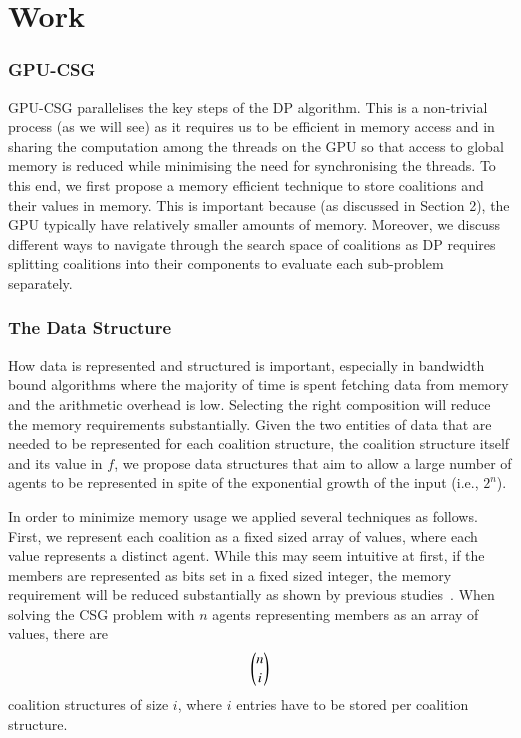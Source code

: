 \documentclass[a4paper, 12pt]{report}
\begin{document}
\section{Work}


\subsubsection{GPU-CSG} \label{sec:gpu-csg} %
GPU-CSG parallelises the key steps of the DP algorithm. This is a non-trivial
process (as we will see) as it requires us to be efficient in memory access and
in sharing the computation among the threads on the GPU so that access to global
memory is reduced while minimising the need for synchronising the threads. To
this end, we first propose a memory efficient technique to store coalitions and
their values in memory. This is important because (as discussed  in Section 2),
the GPU typically have relatively smaller amounts of memory. Moreover, we
discuss different ways to navigate through the search space of coalitions as DP
requires splitting coalitions into their components to evaluate each sub-problem
separately.
\subsubsection{The Data Structure}\label{sec:data}
How data is represented and structured is important, especially in bandwidth
bound algorithms where the majority of time is spent fetching data from memory
and the arithmetic overhead is low.
Selecting the right composition will reduce the memory requirements
substantially. Given the two entities of data that are needed to be represented
for each coalition structure, the coalition structure itself and its value in
$f$, we propose data structures that aim to allow a large number of agents to be
represented in spite of the exponential growth of the input (i.e., $2^n$).

In order to minimize memory usage we applied several techniques as follows.
First, we represent each coalition as a fixed sized array of values, where each
value represents a distinct agent. While this may seem intuitive at first, if
the members are represented as bits set in a fixed sized integer, the memory
requirement will be reduced substantially as shown by previous
studies~\cite{boyer2012solving}.
When solving the CSG problem with $n$ agents representing members as an array of
values, there are \[\dbinom{n}{i}\] coalition structures of size $i$, where $i$
entries have to be stored per coalition structure.
\end{document}
